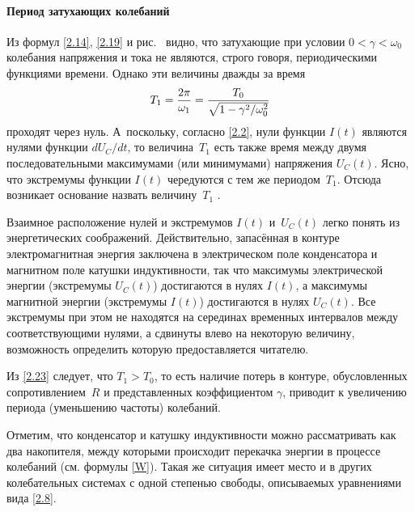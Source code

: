 \paragraph{Период затухающих колебаний}

Из формул \eqref{2.14}, \eqref{2.19} и рис.~ видно, что затухающие
при условии $0<\gamma<\omega_0$ колебания напряжения и тока не являются,
строго говоря, периодическими функциями времени. 
Однако эти величины дважды за время
\begin{equation}\eqmark{2.23}
T_1=\dfrac{2\pi}{\omega_1}=\dfrac{T_0}{\sqrt{1-\gamma^2/\omega_0^2}}
\end{equation}
проходят через нуль. А~поскольку, согласно \eqref{2.2}, нули функции $I(t)$ являются
нулями функции $dU_C/dt$, то величина~$T_1$ есть также время между двумя
последовательными максимумами (или минимумами) напряжения $U_C(t)$.
Ясно, что экстремумы функции $I(t)$ чередуются с тем же периодом~$T_1$. 
Отсюда возникает основание назвать величину~$T_1$ 
.

Взаимное расположение нулей и экстремумов $I(t)$ и~$U_C(t)$ легко понять из
энергетических соображений. Действительно, запасённая в контуре электромагнитная
энергия заключена в электрическом поле конденсатора и магнитном поле катушки
индуктивности, так что максимумы электрической энергии (экстремумы $U_C(t)$)
достигаются в нулях $I(t)$, а максимумы магнитной энергии (экстремумы $I(t)$)
достигаются в нулях $U_C(t)$. Все экстремумы при этом не находятся на серединах 
временных интервалов между соответствующими нулями, а сдвинуты влево на некоторую 
величину, возможность определить которую предоставляется читателю.

Из \eqref{2.23} следует, что $T_1>T_0$, то есть наличие потерь в
контуре, обусловленных сопротивлением~$R$ и представленных коэффициентом
$\gamma$, приводит к увеличению периода (уменьшению частоты) колебаний.

Отметим, что конденсатор и катушку индуктивности можно рассматривать как два 
накопителя, между которыми происходит перекачка энергии в процессе колебаний
(см. формулы \eqref{W}). 
Такая же ситуация имеет место и в других колебательных системах с одной степенью 
свободы, описываемых уравнениями вида \eqref{2.8}.


